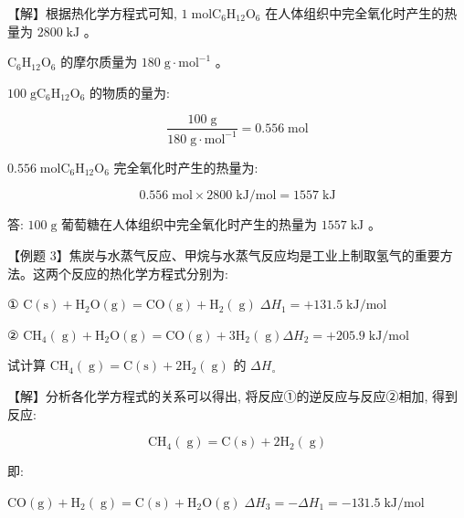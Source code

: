 \documentclass[10pt]{article}
\begin{document}
【解】根据热化学方程式可知, \(1\mathrm{\;{mol}}{\mathrm{C}}_{6}{\mathrm{H}}_{12}{\mathrm{O}}_{6}\) 在人体组织中完全氧化时产生的热量为 \({2800}\mathrm{\;{kJ}}\) 。

\({\mathrm{C}}_{6}{\mathrm{H}}_{12}{\mathrm{O}}_{6}\) 的摩尔质量为 \({180}\mathrm{\;g} \cdot {\mathrm{{mol}}}^{-1}\) 。

\({100}\mathrm{\;g}{\mathrm{C}}_{6}{\mathrm{H}}_{12}{\mathrm{O}}_{6}\) 的物质的量为:

\[
\frac{{100}\mathrm{\;g}}{{180}\mathrm{\;g} \cdot {\mathrm{{mol}}}^{-1}} = {0.556}\mathrm{\;{mol}}
\]

\({0.556}\mathrm{\;{mol}}{\mathrm{C}}_{6}{\mathrm{H}}_{12}{\mathrm{O}}_{6}\) 完全氧化时产生的热量为:

\[
{0.556}\mathrm{\;{mol}} \times {2800}\mathrm{\;{kJ}}/\mathrm{{mol}} = {1557}\mathrm{\;{kJ}}
\]

答: \({100}\mathrm{\;g}\) 葡萄糖在人体组织中完全氧化时产生的热量为 \({1557}\mathrm{\;{kJ}}\) 。

【例题 3】焦炭与水蒸气反应、甲烷与水蒸气反应均是工业上制取氢气的重要方法。这两个反应的热化学方程式分别为:

① \(\mathrm{C}\left( \mathrm{s}\right) + {\mathrm{H}}_{2}\mathrm{O}\left( \mathrm{g}\right) = \mathrm{{CO}}\left( \mathrm{g}\right) + {\mathrm{H}}_{2}\left( \mathrm{\;g}\right) \;\Delta {H}_{1} = + {131.5}\mathrm{\;{kJ}}/\mathrm{{mol}}\)

② \({\mathrm{{CH}}}_{4}\left( \mathrm{\;g}\right) + {\mathrm{H}}_{2}\mathrm{O}\left( \mathrm{g}\right) = \mathrm{{CO}}\left( \mathrm{g}\right) + 3{\mathrm{H}}_{2}\left( \mathrm{\;g}\right) \Delta {H}_{2} = + {205.9}\mathrm{\;{kJ}}/\mathrm{{mol}}\)

试计算 \({\mathrm{{CH}}}_{4}\left( \mathrm{\;g}\right) = \mathrm{C}\left( \mathrm{s}\right) + 2{\mathrm{H}}_{2}\left( \mathrm{\;g}\right)\) 的 \(\Delta {H}_{ \circ }\)

【解】分析各化学方程式的关系可以得出, 将反应①的逆反应与反应②相加, 得到反应:

\[
{\mathrm{{CH}}}_{4}\left( \mathrm{\;g}\right) = \mathrm{C}\left( \mathrm{s}\right) + 2{\mathrm{H}}_{2}\left( \mathrm{\;g}\right)
\]

即:

\(\mathrm{{CO}}\left( \mathrm{g}\right) + {\mathrm{H}}_{2}\left( \mathrm{\;g}\right) = \mathrm{C}\left( \mathrm{s}\right) + {\mathrm{H}}_{2}\mathrm{O}\left( \mathrm{g}\right) \;\Delta {H}_{3} = - \Delta {H}_{1} = - {131.5}\mathrm{\;{kJ}}/\mathrm{{mol}}\)
\end{document}

